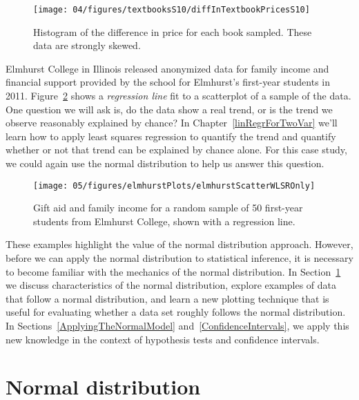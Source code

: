 \begin{figure}[ht]
\centering
\texttt{[image: 04/figures/textbooksS10/diffInTextbookPricesS10]}
\caption{Histogram of the difference in price for each book sampled. These data are strongly skewed.\textA{\vspace{-3mm}}}
\label{diffInTextbookPricesS10_CLTsection}
\end{figure}

\textA{\pagebreak}

\begin{example}{Elmhurst College in Illinois released anonymized data for family income and financial support provided by the school for Elmhurst's first-year students in 2011. Figure~\ref{elmhurstScatterWLSROnly_CLTsection} shows a \emph{regression line} fit to a scatterplot of a sample of the data. One question we will ask is, do the data show a real trend, or is the trend we observe reasonably explained by chance?}
In Chapter~\ref{linRegrForTwoVar} we'll learn how to apply least squares regression to quantify the trend and quantify whether or not that trend can be explained by chance alone. For this case study, we could again use the normal distribution to help us answer this question.
\end{example}

\begin{figure}[ht]
\centering
\texttt{[image: 05/figures/elmhurstPlots/elmhurstScatterWLSROnly]}
\caption{Gift aid and family income for a random sample of 50 first-year students from Elmhurst College, shown with a regression line.\textA{\vspace{-3mm}}}
\label{elmhurstScatterWLSROnly_CLTsection}
\end{figure}

These examples highlight the value of the normal distribution approach. However, before we can apply the normal distribution to statistical inference, it is necessary to become familiar with the mechanics of the normal distribution. In Section~\ref{normalDist} we discuss characteristics of the normal distribution, explore examples of data that follow a normal distribution, and learn a new plotting technique that is useful for evaluating whether a data set roughly follows the normal distribution. In Sections~\ref{ApplyingTheNormalModel} and~\ref{ConfidenceIntervals}, we apply this new knowledge in the context of hypothesis tests and confidence intervals.


\section{Normal distribution}
\label{normalDist}

